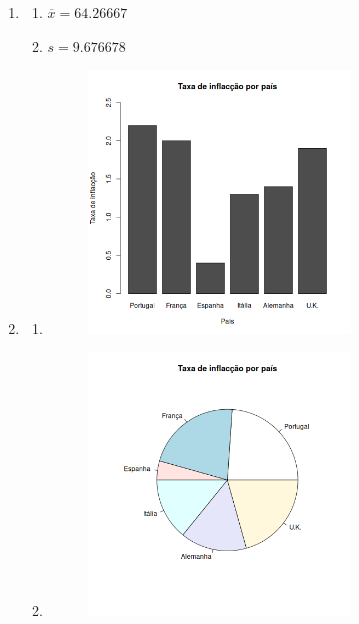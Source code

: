 \documentclass[11pt,a4paper]{article}
\begin{document}
\begin{enumerate}[label=\arabic{section}.\arabic*]
\begin{enumerate}[label=\alph*)]
\begin{figure}[h!]
			\end{figure}
			
		\end{enumerate}
	\item {}\hfill
		\begin{enumerate}[label=\alph*)]
		\item $\overline{x} = 64.26667$\hfill
			
		\item $s = 9.676678$\hfill
			
		\end{enumerate}
	\clearpage
	\item {}\hfill
		\begin{enumerate}[label=\alph*)]
		\item \hfill
			\begin{figure}[h!]
				\centering
				\includegraphics[width=0.7\textwidth]{./recursos/ex4_4a.png}
			\end{figure}
			
		\clearpage
		\item \hfill
			\begin{figure}[h!]
				\centering
				\includegraphics[width=0.7\textwidth]{./recursos/ex4_4b.png}

\end{figure}
\end{enumerate}
\end{enumerate}
\end{document}

